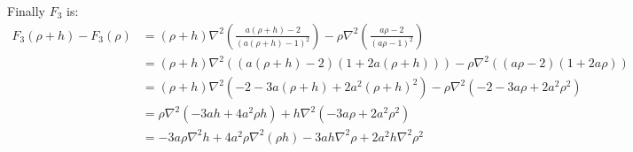 \documentclass[11pt, a4paper]{article}
\theoremstyle{definition}
\begin{document}
Finally $F_3$ is:
\begin{align*}
F_3(\rho + h) - F_3 (\rho) &= (\rho + h) \nabla^2 \left(\frac{a (\rho + h) - 2}{(a (\rho + h) - 1)^2}\right) - \rho \nabla^2 \left(\frac{a \rho - 2}{(a \rho - 1)^2}\right)\\
&= (\rho + h) \nabla^2 \left( (a (\rho + h) - 2) ( 1 + 2a(\rho +h)) \right) - \rho \nabla^2 \left((a \rho - 2) (1 + 2a \rho) \right)\\
&= (\rho + h) \nabla^2 \left( -2 -3a(\rho + h) + 2a^2 (\rho + h)^2 \right) - \rho \nabla^2 \left(-2 -3a \rho + 2a^2 \rho^2\right)\\
&= \rho \nabla^2 \left( - 3ah + 4a^2 \rho h  \right) + h \nabla^2 \left(-3a \rho  + 2a^2 \rho^2 \right)\\
&= - 3a \rho \nabla ^2 h + 4a^2 \rho \nabla^2(\rho h) - 3ah \nabla^2 \rho + 2a^2 h \nabla^2 \rho^2
\end{align*}
\end{document}
